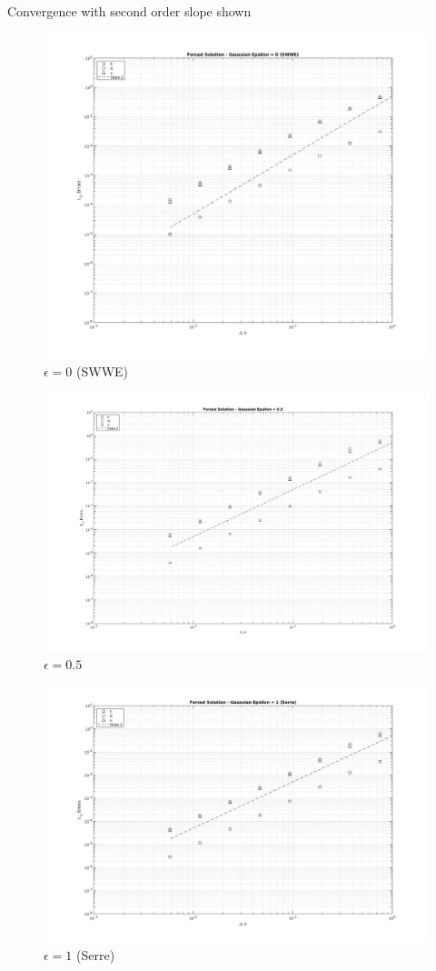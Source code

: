 \documentclass[10pt]{article}
\begin{document}
	Convergence with second order slope shown
	
	\begin{figure}[h!]
		\includegraphics[width=23.0cm]{L2NormsEps0.jpg}
		\caption{$\epsilon = 0$ (SWWE)}
	\end{figure}
	
	\begin{figure}[h!]
		\includegraphics[width=23.0cm]{L2NormsEps0p5.jpg}
		\caption{$\epsilon = 0.5$ }
	\end{figure}
	
	\begin{figure}[h!]
		\includegraphics[width=23.0cm]{L2NormsEps1.jpg}
		\caption{$\epsilon = 1$ (Serre)}
	\end{figure}
	  
\end{document}
